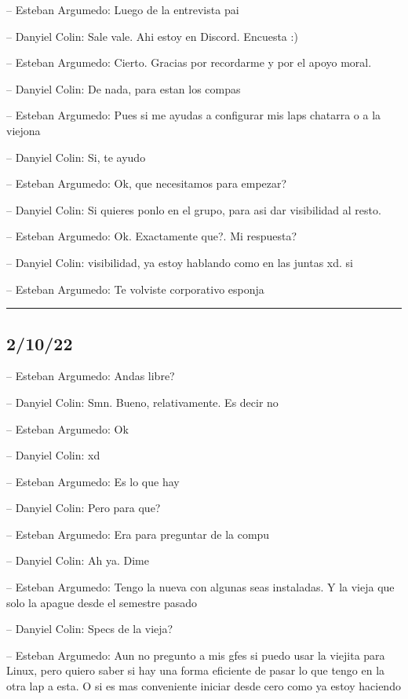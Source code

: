 -- Esteban Argumedo: Luego de la entrevista pai

-- Danyiel Colin: Sale vale. Ahi estoy en Discord. Encuesta :)

-- Esteban Argumedo: Cierto. Gracias por recordarme y por el apoyo
moral.

-- Danyiel Colin: De nada, para estan los compas

-- Esteban Argumedo: Pues si me ayudas a configurar mis laps chatarra o
a la viejona

-- Danyiel Colin: Si, te ayudo

-- Esteban Argumedo: Ok, que necesitamos para empezar?

-- Danyiel Colin: Si quieres ponlo en el grupo, para asi dar visibilidad
al resto.

-- Esteban Argumedo: Ok. Exactamente que?. Mi respuesta?

-- Danyiel Colin: visibilidad, ya estoy hablando como en las juntas xd.
si

-- Esteban Argumedo: Te volviste corporativo esponja

\begin{center}\rule{0.5\linewidth}{0.5pt}\end{center}

\hypertarget{section-3}{%
\subsection{2/10/22}\label{section-3}}

-- Esteban Argumedo: Andas libre?

-- Danyiel Colin: Smn. Bueno, relativamente. Es decir no

-- Esteban Argumedo: Ok

-- Danyiel Colin: xd

-- Esteban Argumedo: Es lo que hay

-- Danyiel Colin: Pero para que?

-- Esteban Argumedo: Era para preguntar de la compu

-- Danyiel Colin: Ah ya. Dime

-- Esteban Argumedo: Tengo la nueva con algunas seas instaladas. Y la
vieja que solo la apague desde el semestre pasado

-- Danyiel Colin: Specs de la vieja?

-- Esteban Argumedo: Aun no pregunto a mis gfes si puedo usar la viejita
para Linux, pero quiero saber si hay una forma eficiente de pasar lo que
tengo en la otra lap a esta. O si es mas conveniente iniciar desde cero
como ya estoy haciendo

